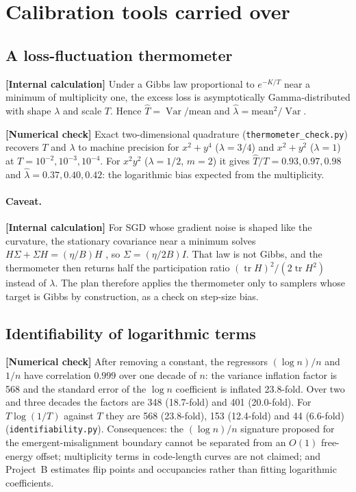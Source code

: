 \documentclass[11pt,a4paper]{article}
\newcommand{\Var}{\operatorname{Var}}
\newcommand{\evl}[2]{{\small\bfseries\color{#1}[#2]}}
\newcommand{\LCalc}{\evl{ccalc}{Internal calculation}}
\newcommand{\LNum}{\evl{cnum}{Numerical check}}
\begin{document}
\section{Calibration tools carried over}
\label{app:calib}
\renewcommand{\theequation}{C.\arabic{equation}}
\setcounter{equation}{0}

\subsection{A loss-fluctuation thermometer}

\LCalc{} Under a Gibbs law proportional to $e^{-K/T}$ near a minimum of
multiplicity one, the excess loss is asymptotically Gamma-distributed
with shape $\lambda$ and scale $T$. Hence $\hat T=\Var/\text{mean}$ and
$\hat\lambda=\text{mean}^2/\Var$.

\LNum{} Exact two-dimensional quadrature (\texttt{thermometer\_check.py})
recovers $T$ and $\lambda$ to machine precision for $x^2+y^4$
($\lambda=3/4$) and $x^2+y^2$ ($\lambda=1$) at $T=10^{-2},10^{-3},10^{-4}$.
For $x^2y^2$ ($\lambda=1/2$, $m=2$) it gives $\hat T/T=0.93,0.97,0.98$ and
$\hat\lambda=0.37,0.40,0.42$: the logarithmic bias expected from the
multiplicity.

\paragraph{Caveat.} \LCalc{} For SGD whose gradient noise is shaped like
the curvature, the stationary covariance near a minimum solves
$H\Sigma+\Sigma H=(\eta/B)H$ \cite{mandt2017}, so $\Sigma=(\eta/2B)I$.
That law is not Gibbs, and the thermometer then returns half the
participation ratio $(\operatorname{tr}H)^2/(2\operatorname{tr}H^2)$ instead
of $\lambda$. The plan therefore applies the thermometer only to samplers
whose target is Gibbs by construction, as a check on step-size bias.

\subsection{Identifiability of logarithmic terms}

\LNum{} After removing a constant, the regressors $(\log n)/n$ and $1/n$
have correlation $0.999$ over one decade of $n$: the variance inflation
factor is 568 and the standard error of the $\log n$ coefficient is
inflated 23.8-fold. Over two and three decades the factors are 348
(18.7-fold) and 401 (20.0-fold). For $T\log(1/T)$ against $T$ they are
568 (23.8-fold), 153 (12.4-fold) and 44 (6.6-fold)
(\texttt{identifiability.py}). Consequences: the $(\log n)/n$ signature
proposed for the emergent-misalignment boundary cannot be separated from
an $O(1)$ free-energy offset; multiplicity terms in code-length curves are
not claimed; and Project~B estimates flip points and occupancies rather
than fitting logarithmic coefficients.
\end{document}
